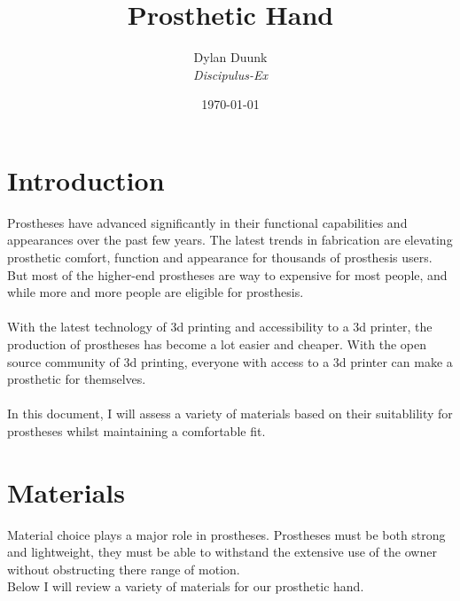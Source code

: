 \documentclass[11pt, a4paper]{article}
\title{\Huge{Prosthetic Hand} }
\author{Dylan Duunk \\ \textit{Discipulus-Ex} }
\date{\today}
\begin{document}
\begin{titlepage}
    \maketitle
\end{titlepage}




\newpage
\tableofcontents
\newpage
{}

\section{Introduction}
Prostheses have advanced significantly in their functional capabilities and appearances over the past few years.
The latest trends in fabrication are elevating prosthetic comfort, function and appearance for thousands of prosthesis users.
But most of the higher-end prostheses are way to expensive for most people, and while more and more people are eligible for prosthesis.
\\ \\
With the latest technology of 3d printing and accessibility to a 3d printer, the production of prostheses has become a lot easier and cheaper.
With the open source community of 3d printing, everyone with access to a 3d printer can make a prosthetic for themselves.
\\ \\
In this document, I will assess a variety of materials based on their suitablility for prostheses whilst maintaining a comfortable fit. 

\section{Materials} \label{materials}
Material choice plays a major role in prostheses.
Prostheses must be both strong and lightweight, they must be able to withstand the extensive use of the owner without obstructing there range of motion.
\\
Below I will review a variety of materials for our prosthetic hand.
\end{document}

